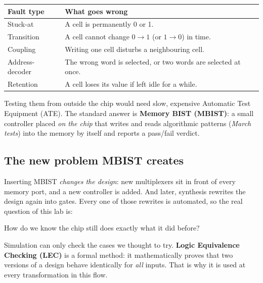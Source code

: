 \documentclass[11pt]{article}
\begin{document}
\begin{center}
\small
\begin{tabular}{@{}p{3.6cm}p{10.4cm}@{}}
\toprule
\textbf{Fault type} & \textbf{What goes wrong} \\ \midrule
Stuck-at & A cell is permanently 0 or 1. \\
Transition & A cell cannot change $0\!\rightarrow\!1$ (or $1\!\rightarrow\!0$) in time. \\
Coupling & Writing one cell disturbs a neighbouring cell. \\
Address-decoder & The wrong word is selected, or two words are selected at once. \\
Retention & A cell loses its value if left idle for a while. \\ \bottomrule
\end{tabular}
\end{center}

Testing them from outside the chip would need slow, expensive Automatic Test Equipment (ATE). The
standard answer is \textbf{Memory BIST (MBIST)}: a small controller placed \emph{on the chip}
that writes and reads algorithmic patterns (\emph{March tests}) into the memory by itself and reports
a pass/fail verdict.

\subsection{The new problem MBIST creates}
Inserting MBIST \emph{changes the design}: new multiplexers sit in front of every memory
port, and a new controller is added. And later, synthesis rewrites the design again into gates.
Every one of those rewrites is automated, so the real question of this lab is:

\begin{keybox}
\centering\large
How do we know the chip still does exactly what it did before?
\end{keybox}

Simulation can only check the cases we thought to try. \textbf{Logic Equivalence Checking
(LEC)} is a formal method: it mathematically proves that two versions of a design behave identically
for \emph{all} inputs. That is why it is used at every transformation in this flow.
\end{document}
